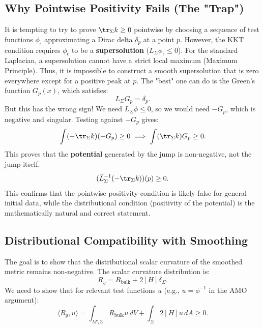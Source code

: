 \subsection{Why Pointwise Positivity Fails (The "Trap")}

It is tempting to try to prove $\tr_\Sigma k \ge 0$ pointwise by choosing a sequence of test functions $\phi_\epsilon$ approximating a Dirac delta $\delta_p$ at a point $p$.
However, the KKT condition requires $\phi_\epsilon$ to be a \textbf{supersolution} ($L_\Sigma \phi_\epsilon \le 0$).
For the standard Laplacian, a supersolution cannot have a strict local maximum (Maximum Principle). Thus, it is impossible to construct a smooth supersolution that is zero everywhere except for a positive peak at $p$.
The "best" one can do is the Green's function $G_p(x)$, which satisfies:
\begin{equation}
    L_\Sigma G_p = \delta_p.
\end{equation}
But this has the wrong sign! We need $L_\Sigma \phi \le 0$, so we would need $-G_p$, which is negative and singular.
Testing against $-G_p$ gives:
\begin{equation}
    \int (-\tr_\Sigma k) (-G_p) \ge 0 \implies \int (\tr_\Sigma k) G_p \ge 0.
\end{equation}
This proves that the \textbf{potential} generated by the jump is non-negative, not the jump itself.
\[
    (\widetilde{L}_\Sigma^{-1} (-\tr_\Sigma k))(p) \ge 0.
\]
This confirms that the pointwise positivity condition is likely false for general initial data, while the distributional condition (positivity of the potential) is the mathematically natural and correct statement.

\subsection{Distributional Compatibility with Smoothing}

The goal is to show that the distributional scalar curvature of the smoothed metric remains non-negative.
The scalar curvature distribution is:
\begin{equation}
    R_{\bar{g}} = R_{\text{bulk}} + 2[H]\delta_\Sigma.
\end{equation}
We need to show that for relevant test functions $u$ (e.g., $u = \phi^{-1}$ in the AMO argument):
\begin{equation}
    \langle R_{\bar{g}}, u \rangle = \int_{M \setminus \Sigma} R_{\text{bulk}} u \, dV + \int_\Sigma 2[H] u \, dA \ge 0.
\end{equation}

